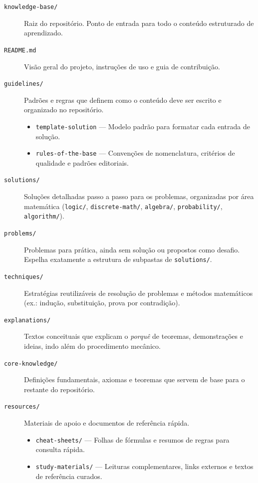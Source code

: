 \begin{description}
  \item[\texttt{knowledge-base/}]
    Raiz do repositório. Ponto de entrada para todo o conteúdo estruturado de aprendizado.

  \item[\texttt{README.md}]
    Visão geral do projeto, instruções de uso e guia de contribuição.

  \item[\texttt{guidelines/}]
    Padrões e regras que definem como o conteúdo deve ser escrito e organizado no
    repositório.
    \begin{itemize}
      \item \texttt{template-solution} --- Modelo padrão para formatar cada entrada de
        solução.
      \item \texttt{rules-of-the-base} --- Convenções de nomenclatura, critérios de
        qualidade e padrões editoriais.
    \end{itemize}

  \item[\texttt{solutions/}]
    Soluções detalhadas passo a passo para os problemas, organizadas por área matemática
    (\texttt{logic/}, \texttt{discrete-math/}, \texttt{algebra/}, \texttt{probability/},
    \texttt{algorithm/}).

  \item[\texttt{problems/}]
    Problemas para prática, ainda sem solução ou propostos como desafio. Espelha exatamente
    a estrutura de subpastas de \texttt{solutions/}.

  \item[\texttt{techniques/}]
    Estratégias reutilizáveis de resolução de problemas e métodos matemáticos (ex.:
    indução, substituição, prova por contradição).

  \item[\texttt{explanations/}]
    Textos conceituais que explicam o \emph{porquê} de teoremas, demonstrações e ideias,
    indo além do procedimento mecânico.

  \item[\texttt{core-knowledge/}]
    Definições fundamentais, axiomas e teoremas que servem de base para o restante
    do repositório.

  \item[\texttt{resources/}]
    Materiais de apoio e documentos de referência rápida.
    \begin{itemize}
      \item \texttt{cheat-sheets/} --- Folhas de fórmulas e resumos de regras para
        consulta rápida.
      \item \texttt{study-materials/} --- Leituras complementares, links externos e textos
        de referência curados.
    \end{itemize}
\end{description}
